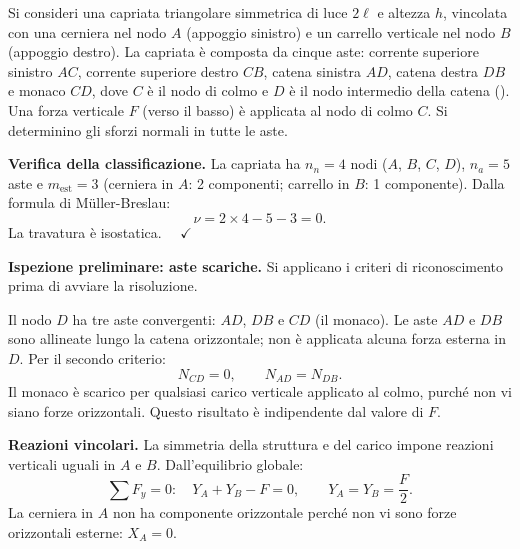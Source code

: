 \begin{esempio}\label{ese:capriata_triangolare}
	Si consideri una capriata triangolare simmetrica
	di luce $2\ell$ e altezza $h$, vincolata con una
	cerniera nel nodo $A$ (appoggio sinistro) e un
	carrello verticale nel nodo $B$ (appoggio destro).
	La capriata è composta da cinque aste: corrente
	superiore sinistro $AC$, corrente superiore destro
	$CB$, catena sinistra $AD$, catena destra $DB$ e
	monaco $CD$, dove $C$ è il nodo di colmo e $D$
	è il nodo intermedio della catena
	().
	Una forza verticale $F$ (verso il basso) è
	applicata al nodo di colmo $C$.
	Si determinino gli sforzi normali in tutte le aste.
	
	\begin{svolgimento}
		



		
		\noindent\textbf{Verifica della classificazione.}
		La capriata ha $n_n = 4$ nodi ($A$, $B$, $C$, $D$),
		$n_a = 5$ aste e $m_\text{est} = 3$ (cerniera in $A$:
		2 componenti; carrello in $B$: 1 componente). Dalla
		formula di M\"{u}ller-Breslau:
		\[
		\nu = 2 \times 4 - 5 - 3 = 0.
		\]
		La travatura è isostatica. $\quad\checkmark$
		
		\noindent\textbf{Ispezione preliminare: aste scariche.}
		Si applicano i criteri di riconoscimento prima di
		avviare la risoluzione.
		
		Il nodo $D$ ha tre aste convergenti: $AD$, $DB$
		e $CD$ (il monaco). Le aste $AD$ e $DB$ sono
		allineate lungo la catena orizzontale; non è
		applicata alcuna forza esterna in $D$. Per il
		secondo criterio:
		\[
		N_{CD} = 0, \qquad N_{AD} = N_{DB}.
		\]
		Il monaco è scarico per qualsiasi carico verticale
		applicato al colmo, purché non vi siano forze
		orizzontali. Questo risultato è indipendente dal
		valore di $F$.
		
		\noindent\textbf{Reazioni vincolari.}
		La simmetria della struttura e del carico impone
		reazioni verticali uguali in $A$ e $B$. Dall'equilibrio
		globale:
		\[
		\sum F_y = 0:\quad
		Y_A + Y_B - F = 0,
		\qquad
		Y_A = Y_B = \frac{F}{2}.
		\]
		La cerniera in $A$ non ha componente orizzontale
		perché non vi sono forze orizzontali esterne:
		$X_A = 0$.
		

\end{svolgimento}
\end{esempio}
